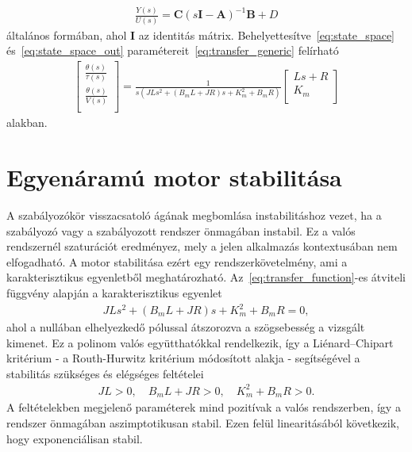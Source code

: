 \begin{align}\label{eq:transfer_generic}
    \frac{Y(s)}{U(s)} = \bm C{\left(s \bm I - \bm A\right)}^{-1} \bm B + D
\end{align}
általános formában, ahol $\bm I$ az identitás mátrix. Behelyettesítve~\eqref{eq:state_space} és~\eqref{eq:state_space_out}
paramétereit~\eqref{eq:transfer_generic} felírható
\begin{align}\label{eq:transfer_function}
    \begin{bmatrix}
        \frac{\theta(s)}{\tau(s)} \\ 
        \frac{\theta(s)}{V(s)} \\ 
    \end{bmatrix}
    =
    \frac{1}{s\left(JLs^2 + \left(B_m L + JR\right)s + K_m^2 + B_m R\right)}
    \begin{bmatrix}
        Ls + R \\ 
        K_m \\ 
    \end{bmatrix}
\end{align}
alakban.

\section{Egyenáramú motor stabilitása}
A szabályozókör visszacsatoló ágának megbomlása instabilitáshoz vezet, ha a 
szabályozó vagy a szabályozott rendszer önmagában instabil. Ez a valós rendszernél 
szaturációt eredményez, mely a jelen alkalmazás kontextusában nem elfogadható. A motor stabilitása ezért 
egy rendszerkövetelmény, ami a karakterisztikus egyenletből meghatározható.
Az~\eqref{eq:transfer_function}-es átviteli függvény alapján a karakterisztikus egyenlet
\begin{align}
    JLs^2 + \left(B_m L + JR\right)s + K_m^2 + B_m R = 0,
\end{align}
ahol a nullában elhelyezkedő pólussal átszorozva a szögsebesség a vizsgált kimenet.
Ez a polinom valós együtthatókkal rendelkezik, így a Liénard–Chipart kritérium - a Routh-Hurwitz kritérium módosított
alakja - segítségével a stabilitás szükséges és elégséges feltételei
\begin{align}
    JL>0,\quad B_m L + JR > 0,\quad K_m^2 + B_m R > 0.
\end{align}
A feltételekben megjelenő paraméterek mind pozitívak a valós rendszerben, így a rendszer
önmagában aszimptotikusan stabil. Ezen felül linearitásából következik, hogy exponenciálisan stabil.

